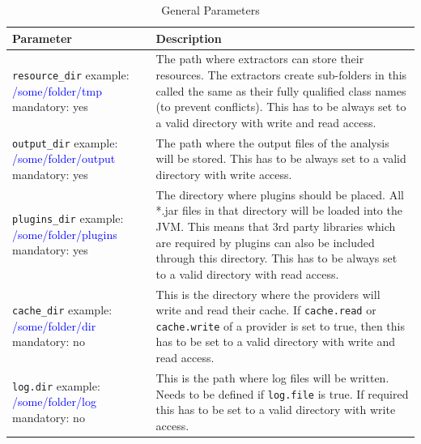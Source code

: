 \begin{table}[t] %
    \caption{General Parameters} \label{tab:propfile}
    \begin{tabularx}{\textwidth}{|p{}|p{}|}\hline
        \textbf{Parameter} & \textbf{Description} \\ \hline \hline
        
        \texttt{resource\_dir} \newline example: \textcolor{blue}{/some/folder/tmp} \newline mandatory: yes  & The path where extractors can store their resources. The extractors create sub-folders in this called the same as their fully qualified class names (to prevent conflicts). This has to be always set to a valid directory with write and read access.\\ \hline
        
        \texttt{output\_dir} \newline example: \textcolor{blue}{/some/folder/output} \newline mandatory: yes & The path where the output files of the analysis will be stored. This has to be always set to a valid directory with write access. \\ \hline
        
        \texttt{plugins\_dir} \newline example: \textcolor{blue}{/some/folder/plugins} \newline mandatory: yes & The directory where plugins should be placed. All *.jar files in that directory will be loaded into the JVM. This means that 3rd party libraries which are required by plugins can also be included through this directory. This has to be always set to a valid directory with read access. \\ \hline
        
        \texttt{cache\_dir} \newline example: \textcolor{blue}{/some/folder/dir} \newline mandatory: no & This is the directory where the providers will write and read their cache. If \texttt{cache.read} or \texttt{cache.write} of a provider is set to true, then this has to be set to a valid directory with write and read access.\\ \hline
        
        \texttt{log.dir} \newline example: \textcolor{blue}{/some/folder/log} \newline mandatory: no  & This is the path where log files will be written. Needs to be defined if \texttt{log.file} is true. If required this has to be set to a valid directory with write access. \\ \hline
        

\end{tabularx}
\end{table}
